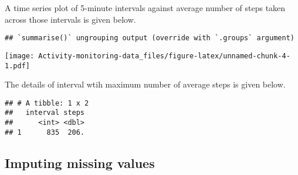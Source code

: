 \documentclass[]{article}
\newenvironment{Shaded}{\begin{snugshade}}{\end{snugshade}}
\newcommand{\KeywordTok}[1]{\textcolor[rgb]{0.13,0.29,0.53}{\textbf{#1}}}
\newcommand{\DataTypeTok}[1]{\textcolor[rgb]{0.13,0.29,0.53}{#1}}
\newcommand{\StringTok}[1]{\textcolor[rgb]{0.31,0.60,0.02}{#1}}
\newcommand{\OperatorTok}[1]{\textcolor[rgb]{0.81,0.36,0.00}{\textbf{#1}}}
\newcommand{\NormalTok}[1]{#1}
\begin{document}
A time series plot of 5-minute intervals against average number of steps
taken across those intervals is given below.

\begin{Shaded}
\end{Shaded}

\begin{verbatim}
## `summarise()` ungrouping output (override with `.groups` argument)
\end{verbatim}

\begin{Shaded}
\end{Shaded}

\texttt{[image: Activity-monitoring-data\_files/figure-latex/unnamed-chunk-4-1.pdf]}

The details of interval wtih maximum number of average steps is given
below.

\begin{Shaded}
\end{Shaded}

\begin{verbatim}
## # A tibble: 1 x 2
##   interval steps
##      <int> <dbl>
## 1      835  206.
\end{verbatim}

\subsection{Imputing missing values}\label{imputing-missing-values}
\end{document}
